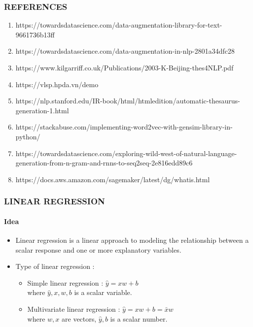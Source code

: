 \documentclass[10pt]{beamer}
\begin{document}
\begin{frame}
    \frametitle{\textbf{REFERENCES}}
    \begin{enumerate}
        \item https://towardsdatascience.com/data-augmentation-library-for-text-9661736b13ff 
        \item https://towardsdatascience.com/data-augmentation-in-nlp-2801a34dfc28 
        \item https://www.kilgarriff.co.uk/Publications/2003-K-Beijing-thes4NLP.pdf 
        \item https://vlsp.hpda.vn/demo 
        \item https://nlp.stanford.edu/IR-book/html/htmledition/automatic-thesaurus-generation-1.html 
        \item https://stackabuse.com/implementing-word2vec-with-gensim-library-in-python/ 
        \item https://towardsdatascience.com/exploring-wild-west-of-natural-language-generation-from-n-gram-and-rnns-to-seq2seq-2e816edd89c6 
        \item https://docs.aws.amazon.com/sagemaker/latest/dg/whatis.html 
    \end{enumerate}
\end{frame}
\begin{frame}
	\frametitle{\textbf{LINEAR REGRESSION}}
	\framesubtitle{Idea}
	\begin{itemize}
		\item Linear regression is a linear approach to modeling the relationship between a scalar response and one or more explanatory variables.
		\item Type of linear regression : 
		\begin{itemize}
			\item Simple linear regression : $ \hat{y} = xw + b $
			 \\ where $\hat{y}, x, w, b$ is a scalar variable.
			\item Multivariate linear regression : $ \hat{y} = xw + b = \bar{x}w$
			 \\ where $w, x$ are vectors, $\hat{y}, b$ is a scalar number.
		\end{itemize}
    \end{itemize}
\end{frame}
\end{document}
